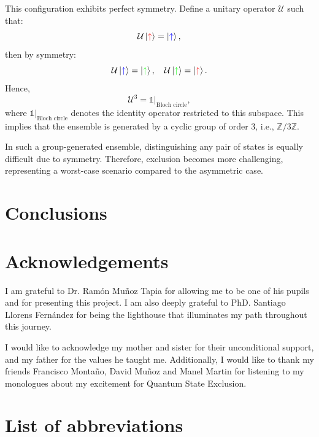 \documentclass[12pt,letterpaper]{article}
\begin{document}
\begin{multicols}{2}
This configuration exhibits perfect symmetry. Define a unitary operator $\mathcal{U}$ such that:
\[
\mathcal{U} \ket{\textcolor{red}{\uparrow}} = \ket{\textcolor{blue}{\uparrow}},
\]
then by symmetry:
\[
\mathcal{U} \ket{\textcolor{blue}{\uparrow}} = \ket{\textcolor{green}{\uparrow}}, \quad \mathcal{U} \ket{\textcolor{green}{\uparrow}} = \ket{\textcolor{red}{\uparrow}}.
\]
Hence,
\[
\mathcal{U}^3 = \mathds{1}|_{\text{Bloch circle}},
\]
where $\mathds{1}|_{\text{Bloch circle}}$ denotes the identity operator restricted to this subspace. This implies that the ensemble is generated by a cyclic group of order 3, i.e., $\mathbb{Z}/3\mathbb{Z}$.

In such a group-generated ensemble, distinguishing any pair of states is equally difficult due to symmetry. Therefore, exclusion becomes more challenging, representing a worst-case scenario compared to the asymmetric case.

\section{Conclusions}



\section*{Acknowledgements}

I am grateful to Dr. Ramón Muñoz Tapia for allowing me to be one of his pupils and for presenting this project. I am also deeply grateful to PhD. Santiago Llorens Fernández for being the lighthouse that illuminates my path throughout this journey.

I would like to acknowledge my mother and sister for their unconditional support, and my father for the values he taught me. Additionally, I would like to thank my friends Francisco Montaño, David Muñoz and Manel Martin for listening to my monologues about my excitement for Quantum State Exclusion.



 
\section*{List of abbreviations}
\renewcommand{\glsnamefont}[1]{\textbf{#1}}
\printnoidxglossary[type=main, title={\vspace{-1cm}}, nonumberlist, nogroupskip, style=super]


\end{multicols}
\end{document}
